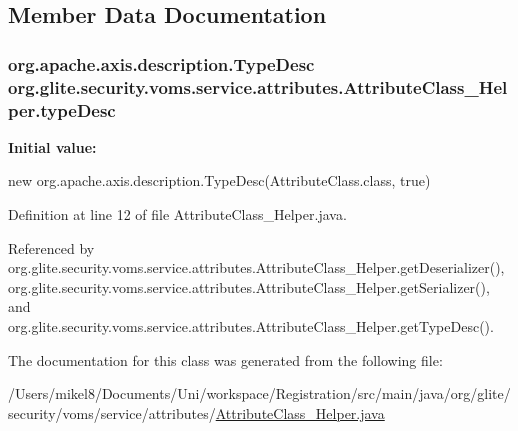 \subsection{Member Data Documentation}
\hypertarget{classorg_1_1glite_1_1security_1_1voms_1_1service_1_1attributes_1_1AttributeClass__Helper_a9319fa705e9805c236dc661a03964c1e}{
\subsubsection[{typeDesc}]{\setlength{\rightskip}{0pt plus 5cm}org.apache.axis.description.TypeDesc {\bf org.glite.security.voms.service.attributes.AttributeClass\_\-Helper.typeDesc}}}
\label{classorg_1_1glite_1_1security_1_1voms_1_1service_1_1attributes_1_1AttributeClass__Helper_a9319fa705e9805c236dc661a03964c1e}
{\bfseries Initial value:}
\begin{DoxyCode}

        new org.apache.axis.description.TypeDesc(AttributeClass.class, true)
\end{DoxyCode}


Definition at line 12 of file AttributeClass\_\-Helper.java.



Referenced by org.glite.security.voms.service.attributes.AttributeClass\_\-Helper.getDeserializer(), org.glite.security.voms.service.attributes.AttributeClass\_\-Helper.getSerializer(), and org.glite.security.voms.service.attributes.AttributeClass\_\-Helper.getTypeDesc().



The documentation for this class was generated from the following file:\begin{DoxyCompactItemize}
\item 
/Users/mikel8/Documents/Uni/workspace/Registration/src/main/java/org/glite/security/voms/service/attributes/\hyperlink{AttributeClass__Helper_8java}{AttributeClass\_\-Helper.java}\end{DoxyCompactItemize}
